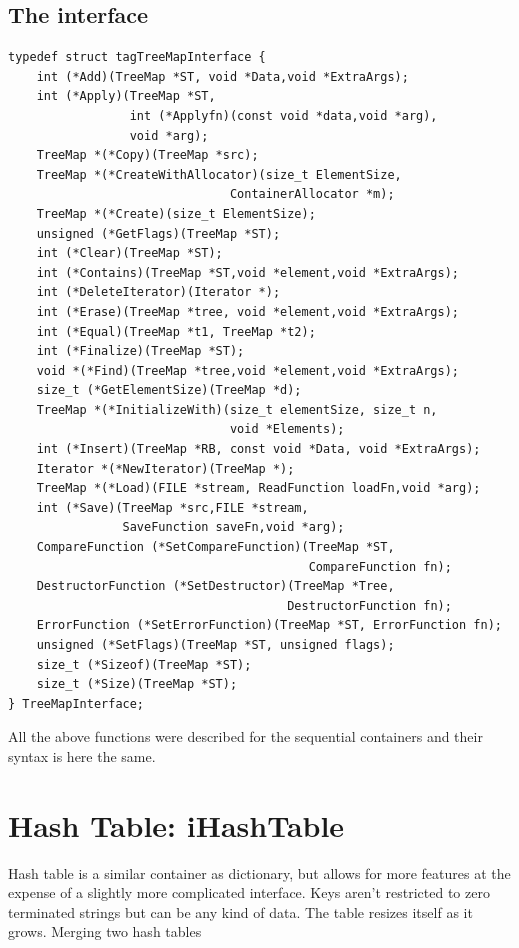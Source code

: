 \documentclass[12pt,a4paper]{memoir} %
\newcommand{\container}{}
\begin{document}
{{\subsection{The interface}
\begin{verbatim}
typedef struct tagTreeMapInterface {
    int (*Add)(TreeMap *ST, void *Data,void *ExtraArgs); 
    int (*Apply)(TreeMap *ST,
                 int (*Applyfn)(const void *data,void *arg),
                 void *arg);
    TreeMap *(*Copy)(TreeMap *src);
    TreeMap *(*CreateWithAllocator)(size_t ElementSize,
                               ContainerAllocator *m);
    TreeMap *(*Create)(size_t ElementSize);
    unsigned (*GetFlags)(TreeMap *ST);
    int (*Clear)(TreeMap *ST); 
    int (*Contains)(TreeMap *ST,void *element,void *ExtraArgs);
    int (*DeleteIterator)(Iterator *);
    int (*Erase)(TreeMap *tree, void *element,void *ExtraArgs);  
    int (*Equal)(TreeMap *t1, TreeMap *t2);
    int (*Finalize)(TreeMap *ST);  
    void *(*Find)(TreeMap *tree,void *element,void *ExtraArgs);
    size_t (*GetElementSize)(TreeMap *d);
    TreeMap *(*InitializeWith)(size_t elementSize, size_t n,
                               void *Elements);
    int (*Insert)(TreeMap *RB, const void *Data, void *ExtraArgs);
    Iterator *(*NewIterator)(TreeMap *);
    TreeMap *(*Load)(FILE *stream, ReadFunction loadFn,void *arg);
    int (*Save)(TreeMap *src,FILE *stream, 
                SaveFunction saveFn,void *arg);
    CompareFunction (*SetCompareFunction)(TreeMap *ST,
                                          CompareFunction fn);
    DestructorFunction (*SetDestructor)(TreeMap *Tree,
                                       DestructorFunction fn);
    ErrorFunction (*SetErrorFunction)(TreeMap *ST, ErrorFunction fn);
    unsigned (*SetFlags)(TreeMap *ST, unsigned flags); 
    size_t (*Sizeof)(TreeMap *ST);
    size_t (*Size)(TreeMap *ST);  
} TreeMapInterface;
\end{verbatim}
All the above functions were described for the sequential containers and their syntax is here the same.
\newpage
\section{Hash Table: iHashTable}
\renewcommand{\container}{HashTable}
Hash table is a similar container as dictionary, but allows for more features at the expense of a slightly more complicated interface. 
Keys aren't restricted to zero terminated strings but can be any kind of data. 
The table resizes itself as it grows.
Merging two hash tables

}}
\end{document}
